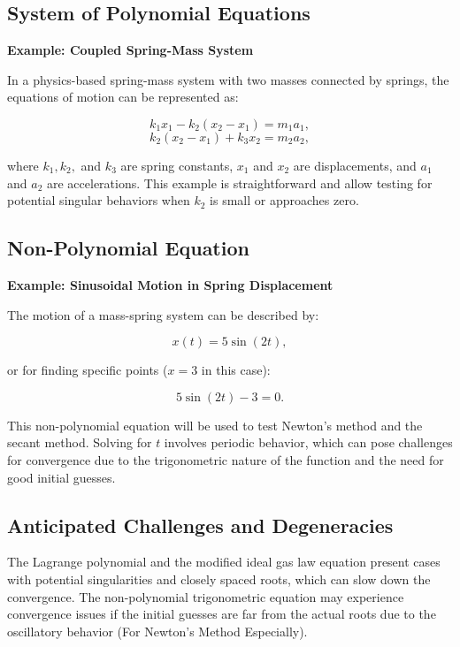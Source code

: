 \documentclass[12pt]{article}
\begin{document}
\subsection*{System of Polynomial Equations}

\textbf{Example: Coupled Spring-Mass System}

\noindent In a physics-based spring-mass system with two masses connected by springs, the equations of motion can be represented as:

\[
    k_1 x_1 - k_2 (x_2 - x_1) = m_1 a_1,
\]
\[
    k_2 (x_2 - x_1) + k_3 x_2 = m_2 a_2,
\]

\noindent where \( k_1, k_2, \) and \( k_3 \) are spring constants, \( x_1 \) and \( x_2 \) are displacements, and \( a_1 \) and \( a_2 \) are accelerations. This example is straightforward and allow testing for potential singular behaviors when \( k_2 \) is small or approaches zero.

\subsection*{Non-Polynomial Equation}

\textbf{Example: Sinusoidal Motion in Spring Displacement}

\noindent The motion of a mass-spring system can be described by:

\[
    x(t) = 5 \sin(2t),
\]

\noindent or for finding specific points ($x = 3$ in this case):

\[
    5 \sin(2t) - 3 = 0.
\]

\noindent This non-polynomial equation will be used to test Newton’s method and the secant method. Solving for \( t \) involves periodic behavior, which can pose challenges for convergence due to the trigonometric nature of the function and the need for good initial guesses.

\subsection*{Anticipated Challenges and Degeneracies}
The Lagrange polynomial and the modified ideal gas law equation present cases with potential singularities and closely spaced roots, which can slow down the convergence. The non-polynomial trigonometric equation may experience convergence issues if the initial guesses are far from the actual roots due to the oscillatory behavior (For Newton's Method Especially).
\end{document}
